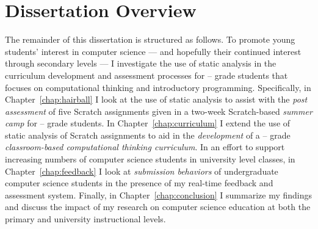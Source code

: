 \section{Dissertation Overview}
The remainder of this dissertation is structured as follows. To promote young
students' interest in computer science --- and hopefully their continued
interest through secondary levels --- I investigate the use of static analysis
in the curriculum development and assessment processes for --
grade students that focuses on computational thinking and introductory
programming. Specifically, in Chapter~\ref{chap:hairball} I look at the use of
static analysis to assist with the \emph{post assessment} of five Scratch
assignments given in a two-week Scratch-based \emph{summer camp} for
-- grade students. In Chapter~\ref{chap:curriculum} I extend the
use of static analysis of Scratch assignments to aid in the \emph{development}
of a -- grade \emph{classroom-based computational thinking
  curriculum}. In an effort to support increasing numbers of computer science
students in university level classes, in Chapter~\ref{chap:feedback} I look at
\emph{submission behaviors} of undergraduate computer science students in the
presence of my real-time feedback and assessment system. Finally, in
Chapter~\ref{chap:conclusion} I summarize my findings and discuss the impact of
my research on computer science education at both the primary and university
instructional levels.
